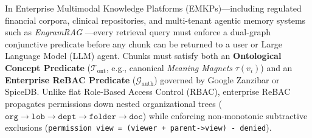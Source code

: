 \documentclass[conference]{IEEEtran}
\begin{document}
In Enterprise Multimodal Knowledge Platforms (EMKPs)---including regulated financial corpora, clinical repositories, and multi-tenant agentic memory systems such as \textit{EngramRAG} \cite{potineni2026engramrag}---every retrieval query must enforce a dual-graph conjunctive predicate before any chunk can be returned to a user or Large Language Model (LLM) agent. Chunks must satisfy both an \textbf{Ontological Concept Predicate} ($\mathcal{T}_{\text{ont}}$, e.g., canonical \textit{Meaning Magnets} $\tau(v_i)$) and an \textbf{Enterprise ReBAC Predicate} ($\mathcal{G}_{\text{auth}}$) governed by Google Zanzibar \cite{pang2019zanzibar} or SpiceDB. Unlike flat Role-Based Access Control (RBAC), enterprise ReBAC propagates permissions down nested organizational trees ($\texttt{org} \to \texttt{lob} \to \texttt{dept} \to \texttt{folder} \to \texttt{doc}$) while enforcing non-monotonic subtractive exclusions (\texttt{permission view = (viewer + parent->view) - denied}).
\end{document}

